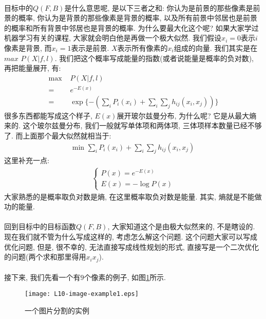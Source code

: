 \documentclass[a4paper]{article}
\renewcommand{\figurename}{图}
\begin{document}
            \paragraph{}目标中的$Q(F, B)$是什么意思呢, 是以下三者之和: 你认为是前景的那些像素是前景的概率, 你认为是背景的那些像素是背景的概率, 以及所有前景中邻居也是前景的概率和所有背景中邻居也是背景的概率. 为什么要最大化这个呢? 如果大家学过机器学习有关的课程, 大家就会明白他是再做一个极大似然. 我们假设$x_i=0$表示$i$像素是背景, 而$x_i=1$表示是前景. $X$表示所有像素的$x_i$组成的向量. 我们其实是在$max$  $P(X|f,l)$. 我们把这个概率写成能量的指数(或者说能量是概率的负对数), 再把能量展开, 有:
            \begin{align*}
           \text{max  } & P(X|f, l) \\
            =& e^{-E(x)}  \\
            =& \exp{\{-(\sum_i {P_i(x_i)} + \sum_i \sum_j h_{ij}(x_i, x_j))\}}
            \end{align*}
            很多东西都能写成这个样子, $E(x)$展开玻尔兹曼分布, 为什么呢? 它是从最大熵来的. 这个玻尔兹曼分布, 我们一般就写单体项和两体项, 三体项样本数量已经不够了. 而上面那个最大似然就相当于:
            \begin{align*}
            \text{min  } \sum_i {P_i(x_i)} + \sum_i \sum_j h_{ij}(x_i, x_j)
            \end{align*}
            这里补充一点:
            \begin{align*}
            \begin{cases}
            P(x) = e^{-E(x)} \\
            E(x) = -\log{P(x)}
            \end{cases}
            \end{align*}
            大家熟悉的是概率取负对数是熵, 在这里概率取负对数是能量. 其实, 熵就是不能做功的能量.
            \paragraph{}回到目标中的目标函数$Q(F, B)$, 大家知道这个是由极大似然来的, 不是瞎设的. 现在我们就不管为什么写成这样的, 考虑怎么解这个问题. 这个问题大家可以写成优化问题, 但是, 很不幸的, 无法直接写成线性规划的形式, 直接写是一个二次优化的问题(两个求和那里得用$x_i x_j$). 
             
            \paragraph{}接下来, 我们先看一个有$9$个像素的例子, 如\figurename\ref{Figure: image_segmentation_example}所示. 
            \begin{figure}[h]
                \centering
                \texttt{[image: L10-image-example1.eps]}
                \caption{一个图片分割的实例}
                \label{Figure: image_segmentation_example}
            \end{figure}
\end{document}
